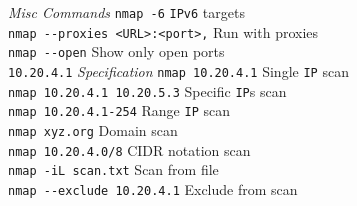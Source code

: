 \documentclass[a4paper,10pt]{article}
\begin{document}
\begin{multicols}{3}
\textit{Misc Commands}
\vskip-5pt
\verb|nmap -6| \dotfill \verb|IPv6| targets\\
\verb|nmap --proxies <URL>:<port>,| \dotfill Run with proxies\\
\verb|nmap --open| \dotfill Show only open ports\\

\verb|10.20.4.1| \textit{Specification}
\vskip-5pt
\verb|nmap 10.20.4.1| \dotfill Single \verb|IP| scan\\
\verb|nmap 10.20.4.1 10.20.5.3| \dotfill Specific \verb|IP|s scan\\
\verb|nmap 10.20.4.1-254| \dotfill Range \verb|IP| scan\\
\verb|nmap xyz.org| \dotfill Domain scan\\
\verb|nmap 10.20.4.0/8| \dotfill CIDR notation scan\\
\verb|nmap -iL scan.txt| \dotfill Scan from file\\
\verb|nmap --exclude 10.20.4.1| \dotfill Exclude from scan\\

\end{multicols}
\end{document}
